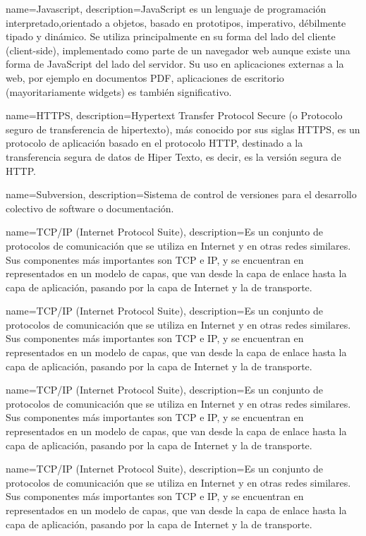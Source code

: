 {name=Javascript,
 description={JavaScript es un lenguaje de programación interpretado,orientado a objetos, basado en prototipos, imperativo, débilmente tipado y dinámico. Se utiliza principalmente en su forma del lado del cliente (client-side), implementado como parte de un navegador web aunque existe una forma de JavaScript del lado del servidor. Su uso en aplicaciones externas a la web, por ejemplo en documentos PDF, aplicaciones de escritorio (mayoritariamente widgets) es también significativo.}
 }
 
{name=HTTPS,
 description={Hypertext Transfer Protocol Secure (o Protocolo seguro de transferencia de hipertexto), más conocido por sus siglas HTTPS, es un protocolo de aplicación basado en el protocolo HTTP, destinado a la transferencia segura de datos de Hiper Texto, es decir, es la versión segura de HTTP.}
 }
 
 
 
{name=Subversion,
 description={Sistema de control de versiones para el desarrollo colectivo de software o documentación.}
 }
 
{name=TCP/IP (Internet Protocol Suite),
 description={Es un conjunto de protocolos de comunicación que se utiliza en Internet y en otras redes similares. Sus componentes más importantes son TCP e IP, y se encuentran en representados en un modelo de capas, que van desde la capa de enlace hasta la capa de aplicación, pasando por la capa de Internet y la de transporte.}
 }
 
{name=TCP/IP (Internet Protocol Suite),
 description={Es un conjunto de protocolos de comunicación que se utiliza en Internet y en otras redes similares. Sus componentes más importantes son TCP e IP, y se encuentran en representados en un modelo de capas, que van desde la capa de enlace hasta la capa de aplicación, pasando por la capa de Internet y la de transporte.}
 }
 
{name=TCP/IP (Internet Protocol Suite),
 description={Es un conjunto de protocolos de comunicación que se utiliza en Internet y en otras redes similares. Sus componentes más importantes son TCP e IP, y se encuentran en representados en un modelo de capas, que van desde la capa de enlace hasta la capa de aplicación, pasando por la capa de Internet y la de transporte.}
 }
 
{name=TCP/IP (Internet Protocol Suite),
 description={Es un conjunto de protocolos de comunicación que se utiliza en Internet y en otras redes similares. Sus componentes más importantes son TCP e IP, y se encuentran en representados en un modelo de capas, que van desde la capa de enlace hasta la capa de aplicación, pasando por la capa de Internet y la de transporte.}
 }
 
